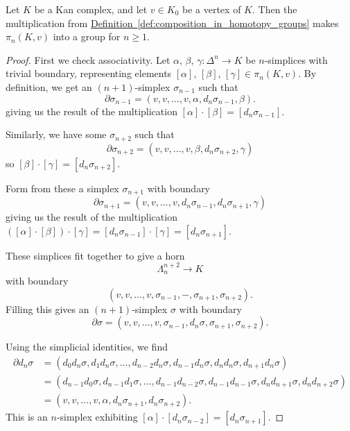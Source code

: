 \documentclass[main.tex]{subfiles}
\begin{document}
\begin{theorem}
  \label{thm:homotopy_groups_are_actual_groups}
  Let $K$ be a Kan complex, and let $v \in K_{0}$ be a vertex of $K$. Then the multiplication from \hyperref[def:composition_in_homotopy_groups]{Definition~\ref*{def:composition_in_homotopy_groups}} makes $\pi_{n}(K, v)$ into a group for $n \geq 1$.
\end{theorem}
\begin{proof}
  First we check associativity. Let $\alpha$, $\beta$, $\gamma \colon \Delta^{n} \to K$ be $n$-simplices with trivial boundary, representing elements $[\alpha]$, $[\beta]$, $[\gamma] \in \pi_{n}(K, v)$. By definition, we get an $(n+1)$-simplex $\sigma_{n-1}$ such that
  \begin{equation*}
    \partial \sigma_{n-1} = (v, v, \ldots, v, \alpha, d_{n} \sigma_{n-1}, \beta).
  \end{equation*}
  giving us the result of the multiplication $[\alpha]\cdot[\beta] = [d_{n}\sigma_{n-1}]$.

  Similarly, we have some $\sigma_{n+2}$ such that
  \begin{equation*}
    \partial\sigma_{n+2} = (v, v, \ldots, v, \beta, d_{n} \sigma_{n+2}, \gamma)
  \end{equation*}
  so $[\beta]\cdot[\gamma] = [d_{n} \sigma_{n+2}]$.

  Form from these a simplex $\sigma_{n+1}$ with boundary
  \begin{equation*}
    \partial \sigma_{n+1} = (v, v, \ldots, v, d_{n} \sigma_{n-1}, d_{n}\sigma_{n+1}, \gamma)
  \end{equation*}
  giving us the result of the multiplication $([\alpha]\cdot[\beta])\cdot[\gamma] = [d_{n}\sigma_{n-1}]\cdot[\gamma] = [d_{n} \sigma_{n+1}]$.

  These simplices fit together to give a horn
  \begin{equation*}
    \Lambda^{n+2}_{n} \to K
  \end{equation*}
  with boundary
  \begin{equation*}
    (v, v, \ldots, v, \sigma_{n-1}, -, \sigma_{n+1}, \sigma_{n+2}).
  \end{equation*}
  Filling this gives an $(n+1)$-simplex $\sigma$ with boundary
  \begin{equation*}
    \partial\sigma = (v, v, \ldots, v, \sigma_{n-1}, d_{n}\sigma, \sigma_{n+1}, \sigma_{n+2}).
  \end{equation*}

  Using the simplicial identities, we find
  \begin{align*}
    \partial d_{n} \sigma &= (d_{0}d_{n}\sigma, d_{1}d_{n}\sigma, \ldots, d_{n-2}d_{n}\sigma, d_{n-1}d_{n}\sigma, d_{n}d_{n}\sigma, d_{n+1}d_{n}\sigma) \\
    &= (d_{n-1}d_{0}\sigma, d_{n-1}d_{1}\sigma, \ldots, d_{n-1}d_{n-2}\sigma, d_{n-1}d_{n-1}\sigma, d_{n}d_{n+1}\sigma, d_{n}d_{n+2}\sigma) \\
    &= (v, v, \ldots, v, \alpha, d_{n}\sigma_{n+1}, d_{n}\sigma_{n+2}).
  \end{align*}
  This is an $n$-simplex exhibiting $[\alpha]\cdot[d_{n}\sigma_{n-2}] = [d_{n}\sigma_{n+1}]$.


\end{proof}
\end{document}
